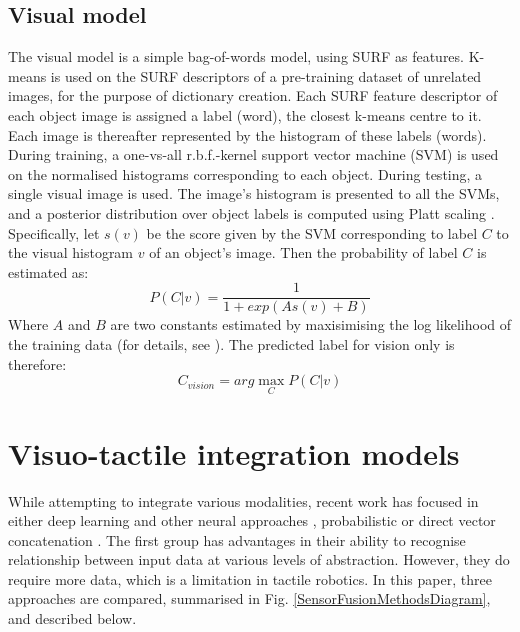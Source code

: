 \documentclass[9pt,technote]{IEEEtran}  %
\begin{document}
\subsection{Visual model}
\label{sec_visualmodel}
The visual model is a simple bag-of-words model, using SURF \cite{Bay2006} as features. K-means %
is used on the SURF descriptors of a pre-training dataset of unrelated images, for the purpose of dictionary creation. Each SURF feature descriptor of each object image is assigned a label (word), the closest k-means centre to it. Each image is thereafter represented by the histogram of these labels (words). During training, a one-vs-all r.b.f.-kernel support vector machine (SVM) is used on the normalised histograms corresponding to each object. During testing, a single visual image is used. The image's histogram is presented to all the SVMs, and a posterior distribution over object labels is computed using Platt scaling \cite{Platt1999}. Specifically, let $s(v)$ be the score given by the SVM corresponding to label $C$ to the visual histogram $v$ of an object's image. Then the probability of label $C$ is estimated as:
\begin{equation}
P(C|v) = \frac{1}{1+exp(As(v)+B)} 
\label{eqn_pcv}
\end{equation}
Where $A$ and $B$ are two constants estimated by maxisimising the log likelihood of the training data (for details, see \cite{Platt1999}). The predicted label for vision only is therefore:
\begin{equation}
C_{vision} = arg \max_{C} P(C | v)
\label{eqn_cvision}
\end{equation}

\section{Visuo-tactile integration models}
\label{sec_visuotactilemodels}
While attempting to integrate various modalities, recent work has focused in either deep learning and other neural approaches \cite{NIPS2012_4683,Wu2013a,Schmitz2014}, probabilistic \cite{Liu2012a} or direct vector concatenation \cite{Yang2015}. The first group has advantages in their ability to recognise relationship between input data at various levels of abstraction. However, they do require more data, which is a limitation in tactile robotics. In this paper, three approaches are compared, summarised in Fig. \ref{SensorFusionMethodsDiagram}, and described below.

\begin{figure}
	\centering
	\end{figure}
\end{document}
